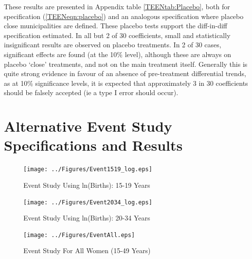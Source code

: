 \documentclass[11pt,subeqn]{article}
\begin{document}
\begin{spacing}{1.4}
These results are presented in Appendix table \ref{TEENtab:Placebo}, both for 
specification (\ref{TEENeqn:placebo}) and an analogous specification where 
placebo close municipalities are defined.  These placebo tests support the 
diff-in-diff specification estimated.  In all but 2 of 30 coefficients, small
and statistically insignificant results are observed on placebo treatments.  In
2 of 30 cases, significant effects are found (at the 10\% level), although these 
are always on placebo `close' treatments, and not on the main treatment itself.  
Generally this is quite strong evidence in favour of an absence of pre-treatment 
differential trends, as at 10\% significance levels, it is expected that 
approximately 3 in 30 coefficients should be falsely accepted (ie a type I error
should occur).



\section{Alternative Event Study Specifications and Results}
\begin{figure}[htpb!]
  \begin{center}
    \caption{Event Study Using ln(Births): 15-19 Years}
    \vspace{-5mm}
    \label{TEENfig:Event1519log}
    \texttt{[image: ../Figures/Event1519\_log.eps]}
  \end{center}
\end{figure}

\begin{figure}[htpb!]
  \begin{center}
    \caption{Event Study Using ln(Births): 20-34 Years}
    \vspace{-5mm}
    \label{TEENfig:Event2034log}
    \texttt{[image: ../Figures/Event2034\_log.eps]}
  \end{center}
  \end{figure}

\begin{figure}[htpb!]
  \begin{center}
    \caption{Event Study For All Women (15-49 Years)}
    \vspace{-5mm}
    \label{TEENfig:EventAll}
    \texttt{[image: ../Figures/EventAll.eps]}
  \end{center}
\end{figure}


\end{spacing}
\end{document}
